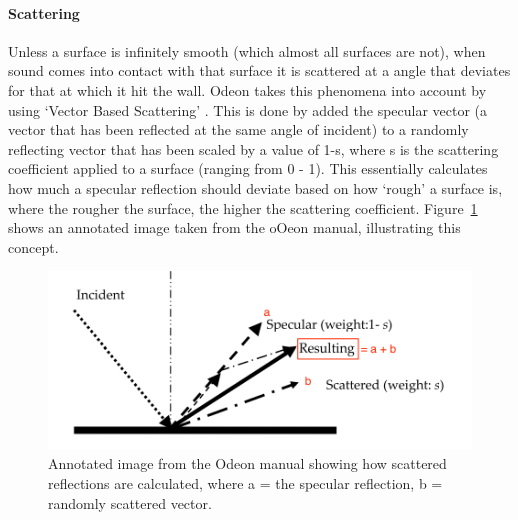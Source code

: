 \documentclass[../../main.tex]{subfiles}
\begin{document}
		\paragraph{Scattering}
		\label{background:scattering}	

			Unless a surface is infinitely smooth (which almost all surfaces are not), when sound comes into contact with that surface it is scattered at a angle that deviates for that at which it hit the wall. Odeon takes this phenomena into account by using `Vector Based Scattering' \cite{odeonManual}. This is done by added the specular vector (a vector that has been reflected at the same angle of incident) to a randomly reflecting vector that has been scaled by a value of 1-s, where s is the scattering coefficient applied to a surface (ranging from 0 - 1). This essentially calculates how much a specular reflection should deviate based on how `rough' a surface is, where the rougher the surface, the higher the scattering coefficient. Figure~\ref{odeonScatterImage} shows an annotated image taken from the oOeon manual, illustrating this concept.


			\begin{figure}[H]
				\center\includegraphics[scale = 1]{Sections/Background/images/scattering_edit.png}
				\caption{Annotated image from the Odeon manual \cite{odeonManual} showing how scattered reflections are calculated, where a = the specular reflection, b = randomly scattered vector.}
				\label{odeonScatterImage}
			\end{figure}



\end{document}
